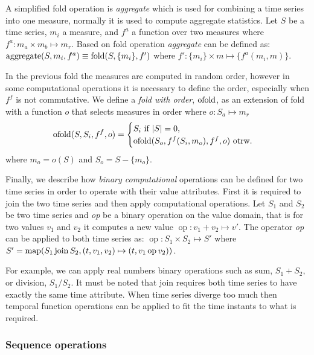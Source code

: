 A simplified fold operation is \emph{aggregate} which is used for
combining a time series into one measure, normally it is used to
compute aggregate statistics.  Let $S$ be a time series, $m_i$ a
measure, and $f^a$ a function over two measures where $f^a: m_a \times
m_b \mapsto m_r$.  Based on fold operation \emph{aggregate} can be
defined as: $\operatorname*{aggregate}(S,m_i,f^a) \equiv \operatorname*{fold}(S,\{m_i\},f')$ where $f':
\{m_i\} \times m \mapsto \{f^a(m_i,m)\}$.

In the previous fold the measures are computed in random order,
however in some computational operations it is necessary to define the
order, especially when $f^f$ is not commutative. We define a
\emph{fold with order}, $\operatorname*{ofold}$, as an extension of fold with a
function $o$ that selects measures in order where $o: S_a \mapsto m_r$
\[
 \operatorname*{ofold}(S,S_i,f^f,o) =
  \begin{cases}
    S_i  \text{ if } |S|=0, \\
    \operatorname*{ofold}(S_o,f^f(S_i,m_o),f^f,o)  \text{ otrw.}
  \end{cases}
\]
where $m_o = o(S)$ and $S_o = S - \{m_o\}$.


Finally, we describe how \emph{binary computational} operations can be
defined for two time series in order to operate with their value
attributes.  First it is required to join the two time series and then
apply computational operations. Let $S_1$ and $S_2$ be two time series
and \emph{op} be a binary operation on the value domain, that is for
two values $v_1$ and $v_2$ it computes a new value $\operatorname{op}:
v_1 + v_2 \mapsto v'$. The operator \emph{op} can be applied to both
time series as: $\operatorname{op}: S_1 \times S_2 \mapsto S'$ where
$S' = \operatorname*{map}(S_1 \operatorname*{join} S_2, (t,v_1,v_2)\mapsto(t,v_1 \operatorname{op}
v_2))$.

For example, we can apply real numbers binary operations such as sum,
$S_1 + S_2$, or division, $S_1 / S_2$. It must be noted that join
requires both time series to have exactly the same time
attribute. When time series diverge too much then temporal function
operations can be applied to fit the time instants to what is
required.





\subsubsection{Sequence operations}


